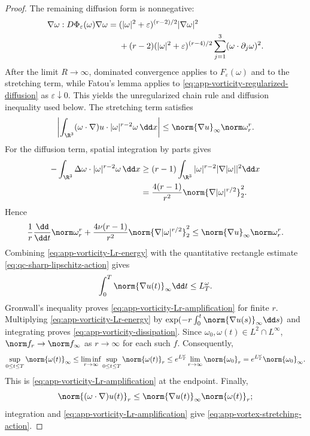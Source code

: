 \begin{proof}
The remaining diffusion form is nonnegative:
\begin{align}
 \nabla\omega:D\Phi_\varepsilon(\omega)\nabla\omega
 ={}&(|\omega|^2+\varepsilon)^{(r-2)/2}|\nabla\omega|^2
 \notag\\
 &+(r-2)(|\omega|^2+\varepsilon)^{(r-4)/2}
 \sum_{j=1}^3(\omega\cdot\partial_j\omega)^2.
 \label{eq:app-vorticity-regularized-diffusion}
\end{align}
After the limit \(R\to\infty\), dominated convergence applies to
\(F_\varepsilon(\omega)\) and to the stretching term, while Fatou's lemma
applies to \eqref{eq:app-vorticity-regularized-diffusion} as
\(\varepsilon\downarrow0\).  This yields the unregularized chain rule and
diffusion inequality used below.  The stretching term
satisfies
\[
 \left|\int_{\R^3}(\omega\cdot\nabla)u\cdot
       |\omega|^{r-2}\omega\,\dd x\right|
 \le\norm{\nabla u}_\infty\norm\omega_r^r.
\]
For the diffusion term, spatial integration by parts gives
\begin{align*}
 -\int_{\R^3}\Delta\omega\cdot|\omega|^{r-2}\omega\,\dd x
 &\ge(r-1)\int_{\R^3}|\omega|^{r-2}|\nabla|\omega||^2\dd x\\
 &=\frac{4(r-1)}{r^2}
   \norm{\nabla|\omega|^{r/2}}_2^2.
\end{align*}
Hence
\begin{equation}
 \frac1r\frac{\dd}{\dd t}\norm\omega_r^r
 +\frac{4\nu(r-1)}{r^2}
   \norm{\nabla|\omega|^{r/2}}_2^2
 \le\norm{\nabla u}_\infty\norm\omega_r^r.
 \label{eq:app-vorticity-Lr-energy}
\end{equation}
Combining \eqref{eq:app-vorticity-Lr-energy} with the quantitative rectangle
estimate \eqref{eq:qc-sharp-lipschitz-action} gives
\[
 \int_0^T\norm{\nabla u(t)}_\infty\dd t\le L_T^\omega.
\]
Gronwall's inequality proves
\eqref{eq:app-vorticity-Lr-amplification} for finite \(r\).  Multiplying
\eqref{eq:app-vorticity-Lr-energy} by
\(
 \exp(-r\int_0^t\norm{\nabla u(s)}_\infty\dd s)
\)
and integrating proves \eqref{eq:app-vorticity-dissipation}.  Since
\(\omega_0,\omega(t)\in L^2\cap L^\infty\),
\(\norm f_r\to\norm f_\infty\) as \(r\to\infty\) for each such \(f\).
Consequently,
\[
 \sup_{0\le t\le T}\norm{\omega(t)}_\infty
 \le\liminf_{r\to\infty}
      \sup_{0\le t\le T}\norm{\omega(t)}_r
 \le e^{L_T^\omega}\lim_{r\to\infty}\norm{\omega_0}_r
 =e^{L_T^\omega}\norm{\omega_0}_\infty.
\]
This is \eqref{eq:app-vorticity-Lr-amplification} at the endpoint.  Finally,
\[
 \norm{(\omega\cdot\nabla)u(t)}_r
 \le\norm{\nabla u(t)}_\infty\norm{\omega(t)}_r;
\]
integration and \eqref{eq:app-vorticity-Lr-amplification} give
\eqref{eq:app-vortex-stretching-action}.
\end{proof}

